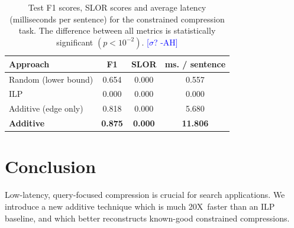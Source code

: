 \documentclass[11pt,a4paper]{article}
\newcommand{\speedup}[0]{20X~}
\newcommand{\ahcomment}[1]{\textcolor{blue}{[#1 -AH]}}
\begin{document}
\begin{table}[]
\begin{tabular}{lccc}
\centering
Approach & F1 & SLOR &  ms. / sentence  \\ \hline
Random {\small (lower bound) }&{\small 0.654}&{\small 0.000}&{\small 0.557}\\
ILP&{\small 0.000}&{\small 0.000}&{\small 0.000}\\
Additive {\small (edge only) }&{\small 0.818}&{\small 0.000}&{\small 5.680}\\
\textbf{Additive}&\textbf{\small 0.875}&\textbf{\small 0.000}&\textbf{\small 11.806}\\
\end{tabular}
\caption{Test F1 scores, SLOR scores and average latency (milliseconds per sentence) for the constrained compression task. 
The difference between all metrics is statistically significant {\small $(p < 10^{-2})$}.
\ahcomment{$\sigma$?}}
\label{t:results}
\end{table}

\section{Conclusion}

Low-latency, query-focused compression is crucial for search applications. We introduce a new additive technique which is much \speedup faster than an ILP baseline, and which better reconstructs known-good constrained compressions. 



%



\end{document}
